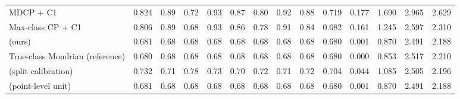 \begin{table}[!htbp]
{\begin{tabular}{lccccccccccccc}
MDCP + C1 & 0.824 & 0.89 & 0.72 & 0.93 & 0.87 & 0.80 & 0.92 & 0.88 & 0.719 & 0.177 & 1.690 & 2.965 & 2.629 \\
Max-class CP + C1 & 0.806 & 0.89 & 0.68 & 0.93 & 0.86 & 0.78 & 0.91 & 0.84 & 0.682 & 0.161 & 1.245 & 2.597 & 2.310 \\
\gamut{} (ours) & 0.681 & 0.68 & 0.68 & 0.68 & 0.68 & 0.68 & 0.68 & 0.68 & 0.680 & 0.001 & 0.870 & 2.491 & 2.188 \\
True-class Mondrian (reference) & 0.680 & 0.68 & 0.68 & 0.68 & 0.68 & 0.68 & 0.68 & 0.68 & 0.680 & 0.000 & 0.853 & 2.517 & 2.210 \\
\gamut{} (split calibration) & 0.732 & 0.71 & 0.78 & 0.73 & 0.70 & 0.72 & 0.71 & 0.72 & 0.704 & 0.044 & 1.085 & 2.505 & 2.196 \\
\gamut{} (point-level unit) & 0.681 & 0.68 & 0.68 & 0.68 & 0.68 & 0.68 & 0.68 & 0.68 & 0.680 & 0.001 & 0.870 & 2.491 & 2.188 \\
\bottomrule
\end{tabular}}
\end{table}

